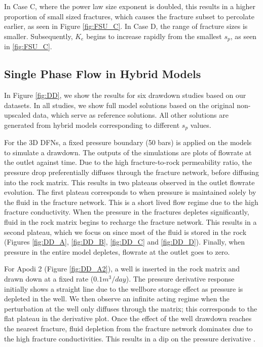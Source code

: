 \documentclass[a4paper]{article}
\begin{document}
In Case C, where the power law size exponent is doubled, this results in a higher proportion of small sized fractures, which causes the fracture subset to percolate earlier, as seen in Figure \ref{fig:FSU_C}. In Case D, the range of fracture sizes is smaller. Subsequently, $K_e$ begins to increase rapidly from the smallest $s_p$, as seen in \ref{fig:FSU_C}. 



\subsection{Single Phase Flow in Hybrid Models}
In Figure \ref{fig:DD}, we show the results for six drawdown studies based on our datasets. In all studies, we show full model solutions based on the original non-upscaled data, which serve as reference solutions. All other solutions are generated from hybrid models corresponding to different $s_p$ values. 

For the 3D DFNs, a fixed pressure boundary (50 bars) is applied on the models to simulate a drawdown. The outputs of the simulations are plots of flowrate at the outlet against time. Due to the high fracture-to-rock permeability ratio, the pressure drop preferentially diffuses through the fracture network, before diffusing into the rock matrix. This results in two plateaus observed in the outlet flowrate evolution. The first plateau corresponds to when pressure is maintained solely by the fluid in the fracture network. This is a short lived flow regime due to the high fracture conductivity. When the pressure in the fractures depletes significantly, fluid in the rock matrix begins to recharge the fracture network. This results in a second plateau, which we focus on since most of the fluid is stored in the rock (Figures \ref{fig:DD_A}, \ref{fig:DD_B}, \ref{fig:DD_C} and \ref{fig:DD_D}). Finally, when pressure in the entire model depletes, flowrate at the outlet goes to zero.

For Apodi 2 (Figure \ref{fig:DD_A2}), a well is inserted in the rock matrix and drawn down at a fixed rate ($0.1m^3/day$). The pressure derivative response initially shows a straight line due to the wellbore storage effect as pressure is depleted in the well. We then observe an infinite acting regime when the perturbation at the well only diffuses through the matrix; this corresponds to the flat plateau in the derivative plot. Once the effect of the well drawdown reaches the nearest fracture, fluid depletion from the fracture network dominates due to the high fracture conductivities. This results in a dip on the pressure derivative \citep{Bourdet1989, Cinco-Ley1976, Egya2018}.
\end{document}
